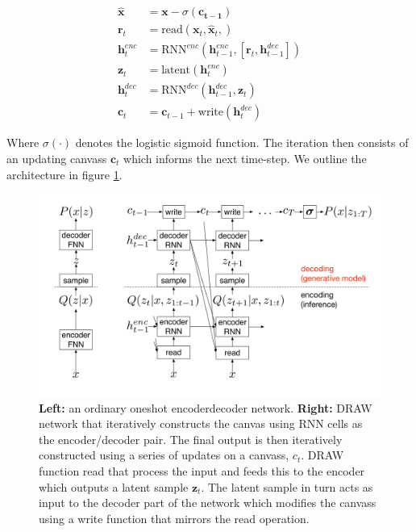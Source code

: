 \begin{align}
\hat{\mathbf{x}} &= \mathbf{x} - \sigma(\mathbf{c_{t-1}}) \\
\mathbf{r}_t &= \text{read}(\mathbf{x}_t, \hat{\mathbf{x}}_t, ) \\
\mathbf{h}^{enc}_t &= \text{RNN}^{enc}( \mathbf{h}^{enc}_{t-1}, [\mathbf{r}_t, \mathbf{h}^{dec}_{t-1}])\\
\mathbf{z}_t &= \text{latent}(\mathbf{h}^{enc}_t)\\
\mathbf{h}^{dec}_t &= \text{RNN}^{dec}( \mathbf{h}^{dec}_{t-1}, \mathbf{z}_t)\\
\mathbf{c}_t &= \mathbf{c}_{t-1} + \text{write}(\mathbf{h}_t^{dec}) \label{eq:draw}
\end{align} 

 \noindent Where $\sigma(\cdot)$ denotes the logistic sigmoid function. The iteration then consists of an updating canvass $\mathbf{c}_t$ which informs the next time-step. We outline the architecture in figure \ref{fig:draw}.

\begin{figure}[h]
\centering
\includegraphics[width=\textwidth]{../figures/draw}
\caption[DRAW network architecture]{\textbf{Left:} an ordinary one\-shot encoder\-decoder network. \textbf{Right:} DRAW network that iteratively constructs the canvas using RNN cells as the encoder/decoder pair. The final output is then iteratively constructed using a series of updates on a canvass, $c_t$. DRAW function read that process the input and feeds this to the encoder which outputs a latent sample $\mathbf{z}_t$. The latent sample in turn acts as input to the decoder part of the network which modifies the canvass using a write function that mirrors the read operation.}\label{fig:draw}
\end{figure}
 
